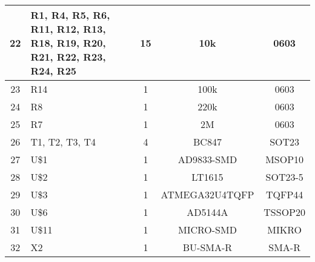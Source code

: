 \begin{center}
\begin{tabular}{|c|p{5cm}|c|c|c|}
22 & R1, R4, R5, R6, R11, R12, R13, R18, R19, R20, R21, R22, R23, R24, R25 & 15 & 10k & 0603 \\ \hline
23 & R14 & 1 & 100k & 0603 \\ \hline
24 & R8 & 1 & 220k & 0603 \\ \hline
25 & R7 & 1 & 2M & 0603 \\ \hline
26 & T1, T2, T3, T4 & 4 & BC847 & SOT23 \\ \hline
27 & U\$1 & 1 & AD9833-SMD & MSOP10  \\ \hline
28 & U\$2 & 1 & LT1615  & SOT23-5  \\ \hline
29 & U\$3 & 1 & ATMEGA32U4TQFP & TQFP44 \\ \hline
30 & U\$6 & 1 & AD5144A & TSSOP20 \\ \hline
31 & U\$11 & 1 & MICRO-SMD & MIKRO \\ \hline
32 & X2 & 1 & BU-SMA-R  & SMA-R \\ \hline

\end{tabular}
\end{center}
